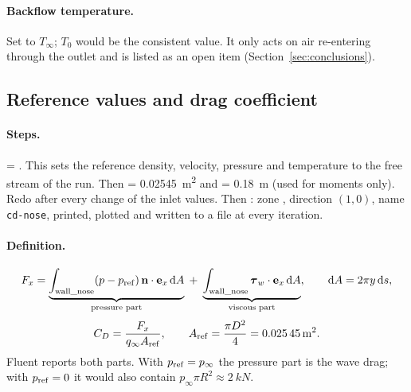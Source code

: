 \paragraph{Backflow temperature.} Set to $T_\infty$; $T_0$ would be the consistent value. It only acts on
air re-entering through the outlet and is listed as an open item (Section~\ref{sec:conclusions}).

\subsection{Reference values and drag coefficient}
\label{sec:reference}

\paragraph{Steps.} \then{} = . This sets the reference
density, velocity, pressure and temperature to the free stream of the run. Then  =
\SI{0.02545}{m^2} and  = \SI{0.18}{m} (used for moments only). Redo  after
every change of the inlet values. Then \then{}\then{}\then
{}: zone , direction $(1, 0)$, name \texttt{cd-nose}, printed, plotted and
written to a file at every iteration.

\paragraph{Definition.}
\begin{equation}
F_x = \underbrace{\int_{\rm wall\_nose} (p - p_{\rm ref})\,\mathbf n\cdot\mathbf e_x\,\mathrm dA}_{\text{pressure part}}
\; + \; \underbrace{\int_{\rm wall\_nose} \boldsymbol\tau_w\cdot\mathbf e_x\,\mathrm dA}_{\text{viscous part}},
\qquad \mathrm dA = 2\pi y\,\mathrm ds,
\end{equation}
\begin{equation}
C_D = \frac{F_x}{q_\infty A_{\rm ref}}, \qquad A_{\rm ref} = \frac{\pi D^2}{4} = \SI{0.02545}{m^2}.
\end{equation}
Fluent reports both parts. With $p_{\rm ref} = p_\infty$ the pressure part is the wave drag; with
$p_{\rm ref} = 0$ it would also contain $p_\infty\pi R^2 \approx \SI{2}{kN}$.
